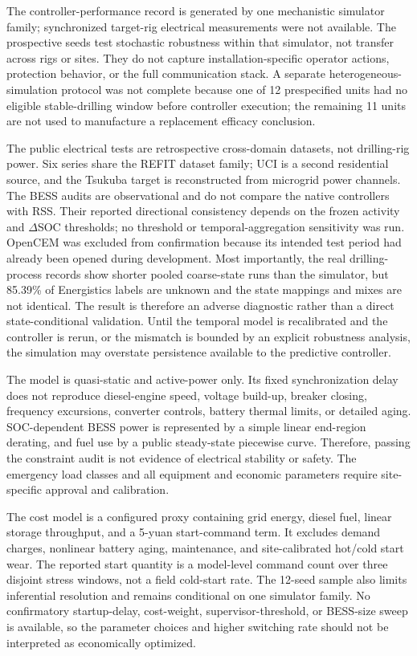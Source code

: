 The controller-performance record is generated by one mechanistic simulator
family; synchronized target-rig electrical measurements were not available.
The prospective seeds test stochastic robustness within that simulator, not
transfer across rigs or sites. They do not capture installation-specific
operator actions, protection behavior, or the full communication stack. A
separate heterogeneous-simulation protocol was not complete because one of 12
prespecified units had no eligible stable-drilling window before controller
execution; the remaining 11 units are not used to manufacture a replacement
efficacy conclusion.

The public electrical tests are retrospective cross-domain datasets, not
drilling-rig power. Six series share the REFIT dataset family; UCI is a second
residential source, and the Tsukuba target is reconstructed from microgrid
power channels. The BESS audits are observational and do not compare the native
controllers with RSS. Their reported directional consistency depends on the
frozen activity and $\Delta$SOC thresholds; no threshold or temporal-aggregation
sensitivity was run. OpenCEM
was excluded from confirmation because its intended test period had already
been opened during development. Most importantly, the real drilling-process
records show shorter pooled coarse-state runs than the simulator, but 85.39\%
of Energistics labels are unknown and the state mappings and mixes are not
identical. The result is therefore an adverse diagnostic rather than a direct
state-conditional validation. Until the temporal model is recalibrated and the
controller is rerun, or the mismatch is bounded by an explicit robustness
analysis, the simulation may overstate persistence available to the predictive
controller.

The model is quasi-static and active-power only. Its fixed synchronization delay
does not reproduce diesel-engine speed, voltage build-up, breaker closing,
frequency excursions, converter controls, battery thermal limits, or detailed
aging. SOC-dependent BESS power is represented by a simple linear end-region
derating, and fuel use by a public steady-state piecewise curve. Therefore,
passing the constraint audit is not evidence of electrical stability or safety.
The emergency load classes and all equipment and economic parameters require
site-specific approval and calibration.

The cost model is a configured proxy containing grid energy, diesel fuel,
linear storage throughput, and a 5-yuan start-command term. It excludes demand
charges, nonlinear battery aging, maintenance, and site-calibrated hot/cold
start wear. The reported start quantity is a model-level command count over
three disjoint stress windows, not a field cold-start rate. The 12-seed sample
also limits inferential resolution and remains conditional on one simulator
family. No confirmatory startup-delay, cost-weight, supervisor-threshold, or
BESS-size sweep is available, so the parameter choices and higher switching
rate should not be interpreted as economically optimized.

